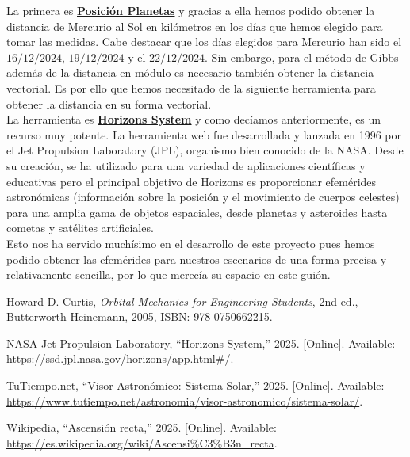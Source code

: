 \documentclass{article}
\numberwithin{equation}{section}
\begin{document}
La primera es \href{https://www.tutiempo.net/astronomia/visor-astronomico/sistema-solar/}{\textbf{Posición Planetas}}
y gracias a ella hemos podido obtener la distancia de 
Mercurio al Sol en kilómetros en los días que hemos elegido 
para tomar las medidas. Cabe destacar que los días elegidos 
para Mercurio han sido el $16/12/2024$, $19/12/2024$ y el 
$22/12/2024$. Sin embargo, para el método de Gibbs además de 
la distancia en módulo es necesario también obtener la distancia 
vectorial. Es por ello que hemos necesitado de la siguiente herramienta 
para obtener la distancia en su forma vectorial. \\

La herramienta es \href{https://ssd.jpl.nasa.gov/horizons/app.html#/}{\textbf{Horizons System}}
y como decíamos anteriormente, es un recurso muy potente. La herramienta web fue desarrollada y lanzada en 1996 por el Jet Propulsion Laboratory (JPL), organismo bien conocido de la NASA. Desde su creación, se ha utilizado para una variedad de aplicaciones científicas y educativas pero el principal objetivo de Horizons es proporcionar efemérides astronómicas (información sobre la posición y el movimiento de cuerpos celestes) para una amplia gama de objetos espaciales, desde planetas y asteroides hasta cometas y satélites artificiales.\\

Esto nos ha servido muchísimo en el desarrollo de este proyecto pues hemos podido obtener las efemérides para nuestros escenarios de una forma precisa y relativamente sencilla, por lo que merecía su espacio en este guión.


\begin{thebibliography}{99}

Howard D. Curtis,
\textit{Orbital Mechanics for Engineering Students},
2nd ed., Butterworth-Heinemann, 2005, ISBN: 978-0750662215.

NASA Jet Propulsion Laboratory,
``Horizons System,'' 2025. [Online]. Available: \url{https://ssd.jpl.nasa.gov/horizons/app.html#/}. 

TuTiempo.net,
``Visor Astronómico: Sistema Solar,'' 2025. [Online]. Available: \url{https://www.tutiempo.net/astronomia/visor-astronomico/sistema-solar/}.

Wikipedia,
``Ascensión recta,'' 2025. [Online]. Available: \url{https://es.wikipedia.org/wiki/Ascensi%C3%B3n_recta}.

\end{thebibliography}
\end{document}
